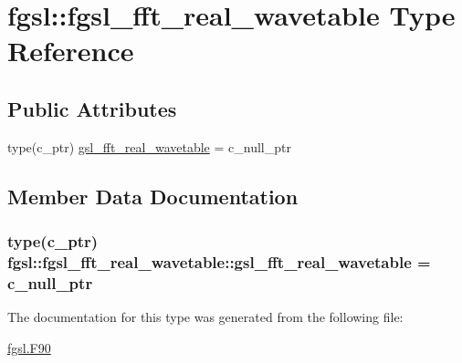 \hypertarget{structfgsl_1_1fgsl__fft__real__wavetable}{}\section{fgsl\+:\+:fgsl\+\_\+fft\+\_\+real\+\_\+wavetable Type Reference}
\label{structfgsl_1_1fgsl__fft__real__wavetable}
\subsection*{Public Attributes}
\begin{DoxyCompactItemize}
\item 
type(c\+\_\+ptr) \hyperlink{structfgsl_1_1fgsl__fft__real__wavetable_aab5a383cf301df5551ecbe80a1ca3044}{gsl\+\_\+fft\+\_\+real\+\_\+wavetable} = c\+\_\+null\+\_\+ptr
\end{DoxyCompactItemize}


\subsection{Member Data Documentation}
\hypertarget{structfgsl_1_1fgsl__fft__real__wavetable_aab5a383cf301df5551ecbe80a1ca3044}{}
\subsubsection[{gsl\+\_\+fft\+\_\+real\+\_\+wavetable}]{\setlength{\rightskip}{0pt plus 5cm}type(c\+\_\+ptr) fgsl\+::fgsl\+\_\+fft\+\_\+real\+\_\+wavetable\+::gsl\+\_\+fft\+\_\+real\+\_\+wavetable = c\+\_\+null\+\_\+ptr}\label{structfgsl_1_1fgsl__fft__real__wavetable_aab5a383cf301df5551ecbe80a1ca3044}


The documentation for this type was generated from the following file\+:\begin{DoxyCompactItemize}
\item 
\hyperlink{fgsl_8F90}{fgsl.\+F90}\end{DoxyCompactItemize}

